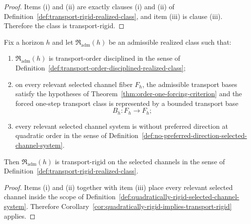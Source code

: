 \begin{proof}
Items (i) and (ii) are exactly clauses (i) and (ii) of
Definition~\ref{def:transport-rigid-realized-class}, and item (iii) is clause
(iii). Therefore the class is transport-rigid.
\end{proof}

\begin{corollary}
\label{cor:no-preferred-direction-implies-transport-rigid}
Fix a horizon $h$ and let $\mathfrak R_{\mathrm{adm}}(h)$ be an admissible
realized class such that:
\begin{enumerate}[label=(\roman*), leftmargin=2em, itemsep=0.2em]
\item $\mathfrak R_{\mathrm{adm}}(h)$ is transport-order disciplined in the
      sense of
      Definition~\ref{def:transport-order-disciplined-realized-class};
\item on every relevant selected channel fiber $F_h$, the admissible transport
      bases satisfy the hypotheses of
      Theorem~\ref{thm:order-one-forcing-criterion} and the forced one-step
      transport class is represented by a bounded transport base
      \[
      B_h:F_h\to F_h;
      \]
\item every relevant selected channel system is without preferred direction at
      quadratic order in the sense of
      Definition~\ref{def:no-preferred-direction-selected-channel-system}.
\end{enumerate}
Then $\mathfrak R_{\mathrm{adm}}(h)$ is transport-rigid on the selected
channels in the sense of
Definition~\ref{def:transport-rigid-realized-class}.
\end{corollary}

\begin{proof}
Items (i) and (ii) together with item (iii) place every relevant selected
channel inside the scope of
Definition~\ref{def:quadratically-rigid-selected-channel-system}. Therefore
Corollary~\ref{cor:quadratically-rigid-implies-transport-rigid} applies.
\end{proof}

